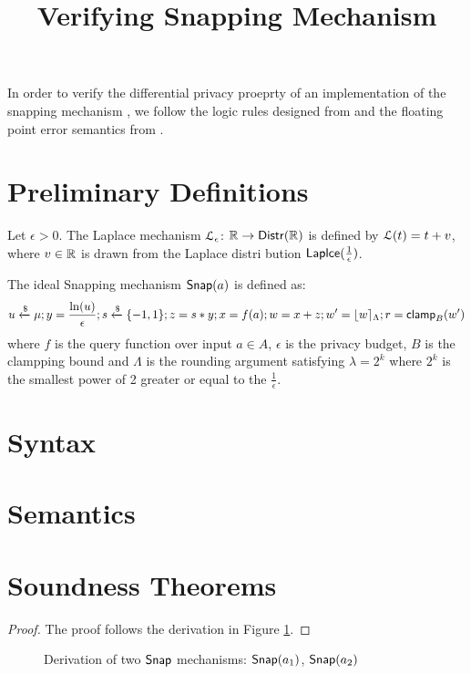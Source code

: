 \documentclass[a4paper,11pt]{article}
\begin{document}
\title{Verifying Snapping Mechanism}

\maketitle
In order to verify the differential privacy proeprty of an implementation of the snapping mechanism \cite{mironov2012significance}, we follow the logic rules designed from \cite{barthe2016proving} and the floating point error semantics from \cite{}.

\section{Preliminary Definitions}
\begin{defn}
Let $\epsilon > 0$. The Laplace mechanism  $\lapmech_{\epsilon}$: $\real \to \distr(\real)$ is defined by $\lapmech(t) = t + v$, where $v \in \real$ is drawn from the Laplace distri bution $\laplace(\frac{1}{\epsilon})$.
\end{defn}

\begin{defn}
The ideal Snapping mechanism $\snap( a)$ is defined as:
\[
	u \xleftarrow{\$} \mu; y = \frac{\ln (u)}{\epsilon}; s \samplel \{-1, 1\}; z = s * y; x = f(a); w = x + z; w' = \round{w}_{\Lambda}; r = \clamp_B (w')
\]
where $f$ is the query function over input $a \in A$, $\epsilon$ is the privacy budget, $B$ is the clampping bound and $\Lambda$ is the rounding argument satisfying $\lambda = 2^k$ where $2^k$ is the smallest power of 2 greater or equal to the $\frac{1}{\epsilon}$.
\end{defn}


\section{Syntax}


\section{Semantics}

\section{Soundness Theorems}


\begin{thm}
\end{thm}

\begin{proof}
The proof follows the derivation in Figure \ref{derivation_snap}.
\end{proof}

\begin{figure}
\begin{mathpar}
\end{mathpar}
\caption{Derivation of two $\snap$ mechanisms: $\snap(a_1)$, $\snap(a_2)$}
\label{derivation_snap}
\end{figure}


\newpage


\end{document}
